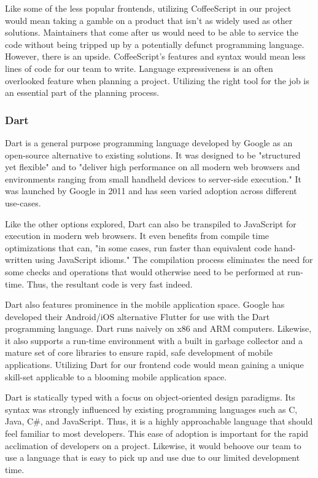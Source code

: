 \documentclass[12pt]{report}
\begin{document}
Like some of the less popular frontends, utilizing CoffeeScript in our project would mean taking a gamble on a product that isn't as widely used as other solutions. Maintainers that come after us would need to be able to service the code without being tripped up by a potentially defunct programming language. However, there is an upside. CoffeeScript's features and syntax would mean less lines of code for our team to write. Language expressiveness is an often overlooked feature when planning a project. Utilizing the right tool for the job is an essential part of the planning process.

\subsubsection*{Dart}

Dart is a general purpose programming language developed by Google as an open-source alternative to existing solutions.\cite{dartlaunch} It was designed to be "structured yet flexible" and to "deliver high performance on all modern web browsers and environments ranging from small handheld devices to server-side execution."\cite{dartlaunch} It was launched by Google in 2011 and has seen varied adoption across different use-cases.

Like the other options explored, Dart can also be transpiled to JavaScript for execution in modern web browsers. It even benefits from compile time optimizations that can, "in some cases, run faster than equivalent code hand-written using JavaScript idioms."\cite{darttalk} The compilation process eliminates the need for some checks and operations that would otherwise need to be performed at run-time. Thus, the resultant code is very fast indeed.

Dart also features prominence in the mobile application space. Google has developed their Android/iOS alternative Flutter for use with the Dart programming language.\cite{darthomepage} Dart runs naively on x86 and ARM computers. Likewise, it also supports a run-time environment with a built in garbage collector and a mature set of core libraries to ensure rapid, safe development of mobile applications. Utilizing Dart for our frontend code would mean gaining a unique skill-set applicable to a blooming mobile application space.

Dart is statically typed with a focus on object-oriented design paradigms. Its syntax was strongly influenced by existing programming languages such as C, Java, C\#, and JavaScript. Thus, it is a highly approachable language that should feel familiar to most developers. This ease of adoption is important for the rapid acclimation of developers on a project. Likewise, it would behoove our team to use a language that is easy to pick up and use due to our limited development time.
\end{document}

